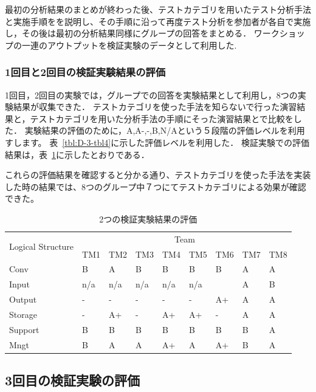 \documentclass[10pt,a4j]{jarticle}
\begin{document}
最初の分析結果のまとめが終わった後、テストカテゴリを用いたテスト分析手法と実施手順をを説明し、その手順に沿って再度テスト分析を参加者が各自で実施し，その後は最初の分析結果同様にグループの回答をまとめる．
ワークショップの一連のアウトプットを検証実験のデータとして利用した.
\subsubsection{1回目と2回目の検証実験結果の評価}
1回目，2回目の実験では，グループでの回答を実験結果として利用し，8つの実験結果が収集できた．
テストカテゴリを使った手法を知らないで行った演習結果と，テストカテゴリを用いた分析手法の手順にそった演習結果とで比較をした．
実験結果の評価のために，A,A-,-,B,N/Aという５段階の評価レベルを利用すします。
表~\ref{tbl:D-3-tbl4}に示した評価レベルを利用した．
検証実験での評価結果は，表~\ref{tbl:D-3-tbl5}に示したとおりである．

これらの評価結果を確認すると分かる通り、テストカテゴリを使った手法を実装した時の結果では、8つのグループ中７つにてテストカテゴリによる効果が確認できた。

\begin{table}[htbp]
\footnotesize
  \centering
  \caption{2つの検証実験結果の評価}
    \begin{tabular}{|l|l|l|l|l|l|l|l|l|}
    \hline
    \multicolumn{1}{|c|}{\multirow{2}[4]{*}{Logical
Structure}} & \multicolumn{8}{c|}{Team} \bigstrut\\
\cline{2-9}          & TM1   & TM2   & TM3   & TM4   & TM5   & TM6 & TM7 & TM8 \bigstrut\\
    \hline
    Conv  & B     & A     & B     & B     & B     & B & A     & A\bigstrut\\
    \hline
    Input &  n/a     &   n/a    &   n/a    &   n/a    &   n/a    &  & A     & B   \bigstrut\\
    \hline
    Output & -     & -     & -     & -     & -     & A+ & A     & A \bigstrut\\
    \hline
    Storage & -     & A+    & -     & A+    & A+    & -& A     & A  \bigstrut\\
    \hline
    Support & B     & B     & B     & B     & B     & B& B     & A \bigstrut[t]\\
    Mngt  & B     & A     & A     & A+    & A     & A+& B     & A \bigstrut[b]\\
    \hline
    \end{tabular}%
  \label{tbl:D-3-tbl5}%
\end{table}%


\subsection{3回目の検証実験の評価} \label{sec:3-2}
\end{document}

